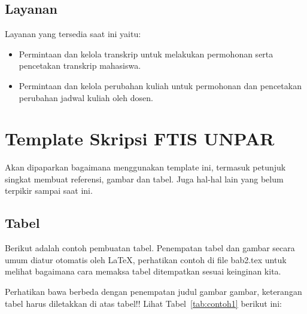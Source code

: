 \subsection{Layanan}
Layanan yang tersedia saat ini yaitu:
\begin{itemize}
	\item Permintaan dan kelola transkrip untuk melakukan permohonan serta pencetakan transkrip mahasiswa.
	\item Permintaan dan kelola perubahan kuliah untuk permohonan dan pencetakan perubahan jadwal kuliah oleh dosen.
\end{itemize}

\section{Template Skripsi FTIS UNPAR}
\label{sec:template}
 
Akan dipaparkan bagaimana menggunakan template ini, termasuk petunjuk singkat membuat referensi, gambar dan tabel.
Juga hal-hal lain yang belum terpikir sampai saat ini. 
 

\subsection{Tabel}  
Berikut adalah contoh pembuatan tabel. 
Penempatan tabel dan gambar secara umum diatur otomatis oleh \LaTeX{}, perhatikan contoh di file bab2.tex untuk melihat bagaimana cara memaksa tabel ditempatkan sesuai keinginan kita.

Perhatikan bawa berbeda dengan penempatan judul gambar gambar, keterangan tabel harus diletakkan di atas tabel!!
Lihat Tabel~\ref{tab:contoh1} berikut ini:

